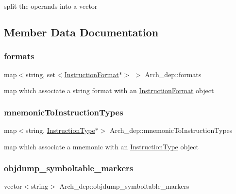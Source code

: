 split the operands into a vector 

\subsection{Member Data Documentation}
\mbox{\label{classArch__dep_aeeeb564f05fb3d397d87f2869663ad2e}} 
\subsubsection{\texorpdfstring{formats}{formats}}
{\footnotesize\ttfamily map$<$string, set$<$\hyperlink{classInstructionFormat}{Instruction\+Format}$\ast$$>$ $>$ Arch\+\_\+dep\+::formats\hspace{0.3cm}{\ttfamily [protected]}}

map which associate a string format with an \hyperlink{classInstructionFormat}{Instruction\+Format} object \mbox{\label{classArch__dep_a21dc91a47a70b553207b199458784f77}} 
\subsubsection{\texorpdfstring{mnemonic\+To\+Instruction\+Types}{mnemonicToInstructionTypes}}
{\footnotesize\ttfamily map$<$string, \hyperlink{classInstructionType}{Instruction\+Type}$\ast$$>$ Arch\+\_\+dep\+::mnemonic\+To\+Instruction\+Types\hspace{0.3cm}{\ttfamily [protected]}}

map which associate a mnemonic with an \hyperlink{classInstructionType}{Instruction\+Type} object \mbox{\label{classArch__dep_a60ff2387eef16e09dceefea48a0da8ab}} 
\subsubsection{\texorpdfstring{objdump\+\_\+symboltable\+\_\+markers}{objdump\_symboltable\_markers}}
{\footnotesize\ttfamily vector$<$string$>$ Arch\+\_\+dep\+::objdump\+\_\+symboltable\+\_\+markers\hspace{0.3cm}{\ttfamily [protected]}}

